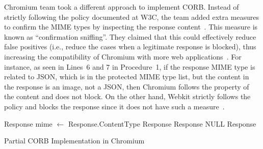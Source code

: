 \documentclass[10pt,conference]{IEEEtran}
\begin{document}
Chromium team took a different approach to implement CORB. Instead of strictly following the policy documented at W3C\cite{noauthor_fetch_nodate}, the team added extra measures to confirm the MIME types by inspecting the response content~\cite{noauthor_mime_nodate}. This measure is known as ``confirmation sniffing''. They claimed that this could effectively reduce false positives (i.e., reduce the cases when a legitimate response is blocked), thus increasing the compatibility of Chromium with more web applications~\cite{corb}. For instance, as seen in Lines~6 and 7 in Procedure~1, if the response MIME type is related to JSON, which is in the protected MIME type list, but the content in the response is an image, not a JSON, then Chromium follows the property of the content and does not block. On the other hand, Webkit strictly follows the policy and blocks the response since it does not have such a measure~\cite{webkitcorb}. 



\label{proc:corb-imp}
\begin{algorithm}
\begin{algorithmic}[1]
        \State \Return Response
    \EndIf
    \State mime $\leftarrow$ Response.ContentType 
            \State \Return Response
        \EndIf
            \State \Return Response
        \EndIf
        \Else
            \State \Return NULL
    \EndIf
    \State \Return Response
    \EndProcedure
\end{algorithmic}
    \caption{Partial CORB Implementation in Chromium}

\end{algorithm}



\end{document}

